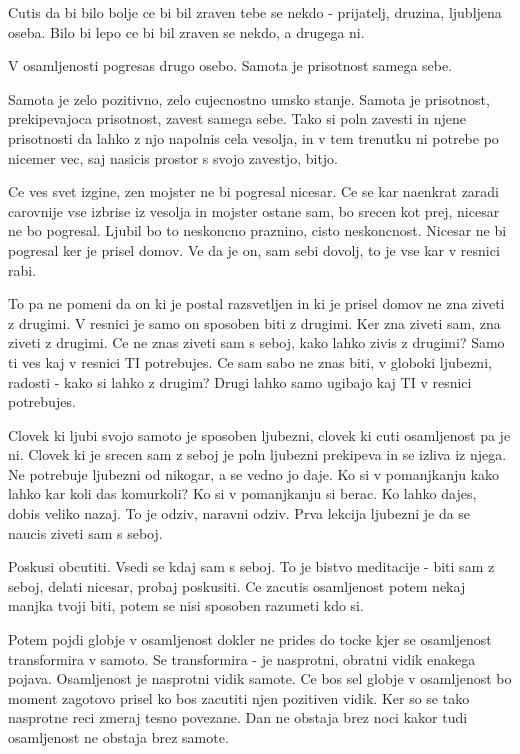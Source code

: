 Cutis da bi bilo bolje ce bi bil zraven tebe se nekdo - prijatelj, druzina, ljubljena oseba. Bilo bi lepo ce bi bil zraven se nekdo, a drugega ni. 

V osamljenosti pogresas drugo osebo. Samota je prisotnost samega sebe. 

Samota je zelo pozitivno, zelo cujecnostno umsko stanje. Samota je prisotnost, prekipevajoca prisotnost, zavest samega sebe. Tako si poln zavesti in njene prisotnosti da lahko z njo napolnis cela vesolja, in v tem trenutku ni potrebe po nicemer vec, saj nasicis prostor s svojo zavestjo, bitjo. 

Ce ves svet izgine, zen mojster ne bi pogresal nicesar. Ce se kar naenkrat zaradi carovnije vse izbrise iz vesolja in mojster ostane sam, bo srecen kot prej, nicesar ne bo pogresal. Ljubil bo to neskoncno praznino, cisto neskoncnost. Nicesar ne bi pogresal ker je prisel domov. Ve da je on, sam sebi dovolj, to je vse kar v resnici rabi. 

To pa ne pomeni da on ki je postal razsvetljen in ki je prisel domov ne zna ziveti z drugimi. V resnici je samo on sposoben biti z drugimi. Ker zna ziveti sam, zna ziveti z drugimi. Ce ne znas ziveti sam s seboj, kako lahko zivis z drugimi? Samo ti ves kaj v resnici TI potrebujes. Ce sam sabo ne znas biti, v globoki ljubezni, radosti - kako si lahko z drugim? Drugi lahko samo ugibajo kaj TI v resnici potrebujes. 

Clovek ki ljubi svojo samoto je sposoben ljubezni, clovek ki cuti osamljenost pa je ni. Clovek ki je srecen sam z seboj je poln ljubezni prekipeva in se izliva iz njega. Ne potrebuje ljubezni od nikogar, a se vedno jo daje. Ko si v pomanjkanju kako lahko kar koli das komurkoli? Ko si v pomanjkanju si berac. Ko lahko dajes, dobis veliko nazaj. To je odziv, naravni odziv. Prva lekcija ljubezni je da se naucis ziveti sam s seboj. 

Poskusi obcutiti. Vsedi se kdaj sam s seboj. To je bistvo meditacije - biti sam z seboj, delati nicesar, probaj poskusiti. Ce zacutis osamljenost potem nekaj manjka tvoji biti, potem se nisi sposoben razumeti kdo si. 

Potem pojdi globje v osamljenost dokler ne prides do tocke kjer se osamljenost transformira v samoto. Se transformira - je nasprotni, obratni vidik enakega pojava. Osamljenost je nasprotni vidik samote. Ce bos sel globje v osamljenost bo moment zagotovo prisel ko bos zacutiti njen pozitiven vidik. Ker so se tako nasprotne reci zmeraj tesno povezane. Dan ne obstaja brez noci kakor tudi osamljenost ne obstaja brez samote. 

